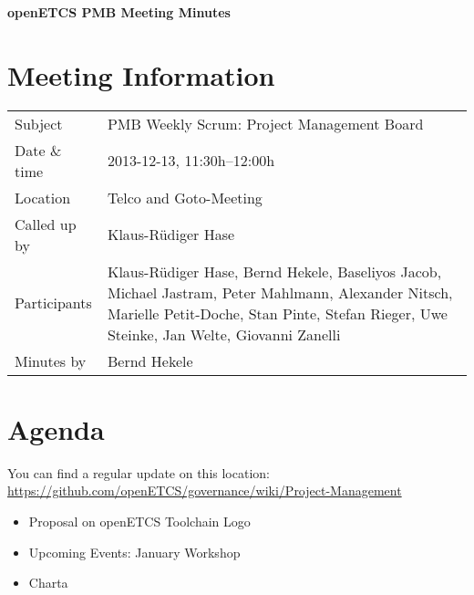 \documentclass[a4paper, 11pt]{article}
\begin{document}
{\begin{center}\huge\bf openETCS PMB Meeting Minutes\end{center}}
\section{Meeting Information}

\renewcommand{\arraystretch}{1.5}
\begin{supertabular}{m{.2\textwidth}m{.8\textwidth}}
Subject & PMB Weekly Scrum: Project Management Board\\
Date \& time & 2013-12-13, 11:30h--12:00h\\
Location & Telco and Goto-Meeting\\
Called up by & Klaus-R\"udiger Hase\\
Participants &
Klaus-R\"udiger Hase,
Bernd Hekele,
Baseliyos Jacob,
Michael Jastram,
Peter Mahlmann,
Alexander Nitsch,
Marielle Petit-Doche,
Stan Pinte,
Stefan Rieger,
Uwe Steinke,
Jan Welte,
Giovanni Zanelli
\\

Minutes by & Bernd Hekele\\

\end{supertabular}
\renewcommand{\arraystretch}{1.0}


\section{{Agenda}}
You can find a regular update on this location: \url{https://github.com/openETCS/governance/wiki/Project-Management}

\begin{itemize}

\item Proposal on openETCS Toolchain Logo
\item Upcoming Events: January Workshop
\item Charta
\end{itemize}
\end{document}
